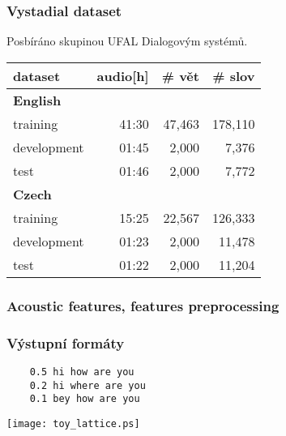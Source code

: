 \begin{frame}\frametitle{Vystadial dataset} 
    \begin{center}
    Posbíráno skupinou UFAL Dialogovým systémů.\\
    \begin{tabular}{lrrr}
        \hline
        dataset & audio[h] & \# vět & \# slov \\
        \hline
        \textbf{English} & & & \\
                training & 41:30 & 47,463 & 178,110 \\
                development & 01:45 & 2,000 & 7,376 \\
                test & 01:46 & 2,000 & 7,772 \\
        \hline
        \textbf{Czech} & & & \\
                training & 15:25 & 22,567 & 126,333 \\
                development & 01:23 & 2,000 & 11,478 \\
                test & 01:22 & 2,000 & 11,204 \\
        \hline
		\end{tabular}
    \end{center}
\end{frame}


\begin{frame}\frametitle{Acoustic features, features preprocessing} 
    
    
\end{frame}

\begin{frame}[fragile]\frametitle{Výstupní formáty} 

    \begin{verbatim}
    0.5 hi how are you
    0.2 hi where are you
    0.1 bey how are you
\end{verbatim}

    \begin{center}
        \texttt{[image: toy\_lattice.ps]}
    \end{center}
\end{frame}


